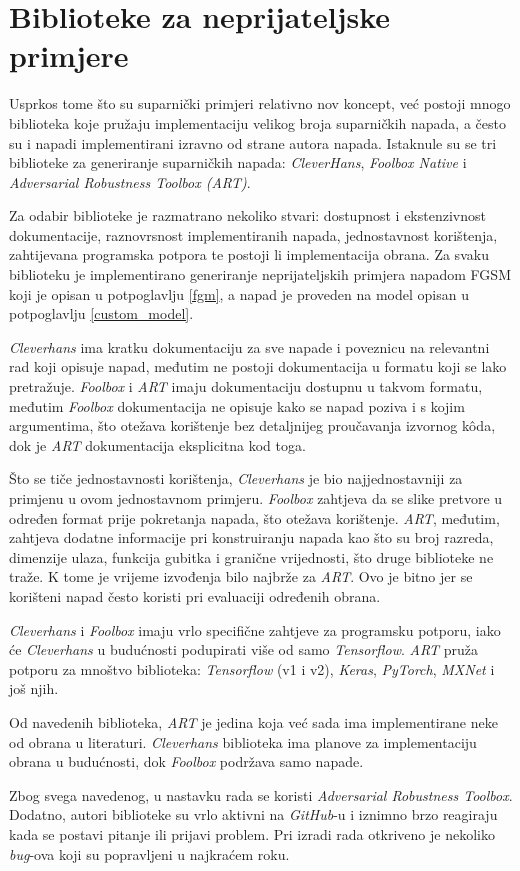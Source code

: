 \documentclass[utf8, diplomski]{fer}
\begin{document}
\section{Biblioteke za neprijateljske primjere}
Usprkos tome što su suparnički primjeri relativno nov koncept, već postoji mnogo biblioteka koje pružaju implementaciju velikog broja suparničkih napada, a često su i napadi implementirani izravno od strane autora napada. Istaknule su se tri biblioteke za generiranje suparničkih napada: \textit{CleverHans}\citep{papernot2018cleverhans}, \textit{Foolbox Native}\citep{rauber2017foolbox} i \textit{Adversarial Robustness Toolbox (ART)}\citep{art2018}.
\par
Za odabir biblioteke je razmatrano nekoliko stvari: dostupnost i ekstenzivnost dokumentacije, raznovrsnost implementiranih napada, jednostavnost korištenja, zahtijevana programska potpora te postoji li implementacija obrana. Za svaku biblioteku je implementirano generiranje neprijateljskih primjera napadom FGSM koji je opisan u potpoglavlju \ref{fgm}, a napad je proveden na model opisan u potpoglavlju \ref{custom_model}.
\par
\textit{Cleverhans} ima kratku dokumentaciju za sve napade i poveznicu na relevantni rad koji opisuje napad, međutim ne postoji dokumentacija u formatu koji se lako pretražuje. \textit{Foolbox} i \textit{ART} imaju dokumentaciju dostupnu u takvom formatu, međutim \textit{Foolbox} dokumentacija ne opisuje kako se napad poziva i s kojim argumentima, što otežava korištenje bez detaljnijeg proučavanja izvornog kôda, dok je \textit{ART} dokumentacija eksplicitna kod toga.
\par
Što se tiče jednostavnosti korištenja, \textit{Cleverhans} je bio najjednostavniji za primjenu u ovom jednostavnom primjeru. \textit{Foolbox} zahtjeva da se slike pretvore u određen format prije pokretanja napada, što otežava korištenje. \textit{ART}, međutim, zahtjeva dodatne informacije pri konstruiranju napada kao što su broj razreda, dimenzije ulaza, funkcija gubitka i granične vrijednosti, što druge biblioteke ne traže. K tome je vrijeme izvođenja bilo najbrže za \textit{ART}. Ovo je bitno jer se korišteni napad često koristi pri evaluaciji određenih obrana.
\par
\textit{Cleverhans} i \textit{Foolbox} imaju vrlo specifične zahtjeve za programsku potporu, iako će \textit{Cleverhans} u budućnosti podupirati više od samo \textit{Tensorflow}. \textit{ART} pruža potporu za mnoštvo biblioteka: \textit{Tensorflow} (v1 i v2), \textit{Keras}, \textit{PyTorch}, \textit{MXNet} i još njih.
\par
Od navedenih biblioteka, \textit{ART} je jedina koja već sada ima implementirane neke od obrana u literaturi. \textit{Cleverhans} biblioteka ima planove za implementaciju obrana u budućnosti, dok \textit{Foolbox} podržava samo napade.
\par
Zbog svega navedenog, u nastavku rada se koristi \textit{Adversarial Robustness Toolbox}. Dodatno, autori biblioteke su vrlo aktivni na \textit{GitHub}-u i iznimno brzo reagiraju kada se postavi pitanje ili prijavi problem. Pri izradi rada otkriveno je nekoliko \textit{bug}-ova koji su popravljeni u najkraćem roku.
\end{document}
